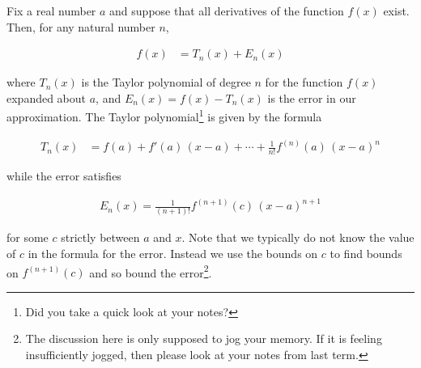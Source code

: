 Fix a real number $a$ and suppose that all derivatives of the function $f(x)$ exist. Then, for any natural number $n$,
\begin{impeqn}\label{eq:TaylorPolyPlusError}
\begin{align*}
f(x) &=T_n(x) +E_n(x)
\end{align*}
\end{impeqn}
\noindent where $T_n(x)$ is the Taylor polynomial of degree $n$
for the function $f(x)$ expanded about $a$, and  $E_n(x)=f(x)-T_n(x)$
is the error in our approximation. The Taylor polynomial\footnote{Did you
take a quick look at your notes?} is given by the formula
%
\resetimpsubeqn %
\begin{impsubeqn}\label{eq:TaylorPolyPlusError_a}
\begin{align*}
T_n(x)&=f(a)+f'(a)\,(x-a)+\cdots+\tfrac{1}{n!}f^{(n)}(a)\, (x-a)^n
\end{align*}
\end{impsubeqn}
\noindent while the error satisfies
\begin{impsubeqn}\label{eq:TaylorPolyPlusError_b}
\begin{align*}
E_n(x)=\tfrac{1}{(n+1)!}f^{(n+1)}(c)\, (x-a)^{n+1}
\end{align*}
\end{impsubeqn}
\noindent for some $c$ strictly between $a$ and $x$. Note that we typically
do not know the value of $c$ in the formula for the error.
Instead we use the bounds on $c$ to find bounds on $f^{(n+1)}(c)$ and
so bound the error\footnote{The discussion here is only supposed to
jog your memory. If it is feeling insufficiently jogged, then
please look at your notes from last term.}.


